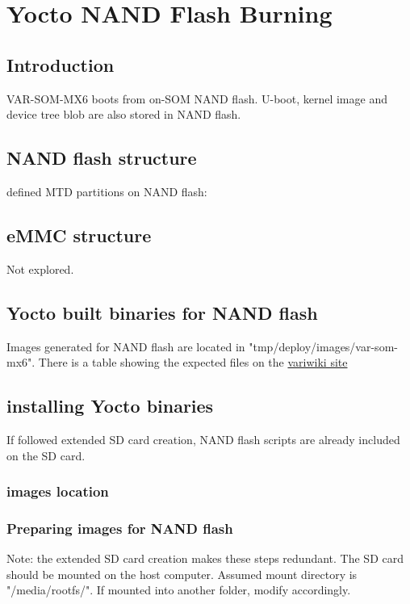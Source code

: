 \documentclass[10pt]{article}
\begin{document}
\section{Yocto NAND Flash Burning\label{sect:NANDFlash}}
\subsection{ Introduction }
VAR-SOM-MX6 boots from on-SOM NAND flash. U-boot, kernel image and device tree blob are also stored in NAND flash.

\subsection{ NAND flash structure }
defined MTD partitions on NAND flash:

\subsection{ eMMC structure }
Not explored.

\subsection{ Yocto built binaries for NAND flash }
Images generated for NAND flash are located in "tmp/deploy/images/var-som-mx6". There is a table showing the expected files on the
\href{http://variwiki.com/index.php?title=Yocto\_NAND\_Flash\_Burning&release=RELEASE\_SUMO\_V1.1\_VAR-SOM-MX6#Yocto\_Built\_binaries\_for\_NAND\_flash\_.2F\_eMMC}{variwiki site}

\subsection{ installing Yocto binaries }
If followed extended SD card creation, NAND flash scripts are already included on the SD card.

\subsubsection{ images location }
%

\subsubsection{ Preparing images for NAND flash }
Note: the extended SD card creation makes these steps redundant.
The SD card should be mounted on the host computer. Assumed mount directory is "/media/rootfs/". If mounted into another folder, modify accordingly.
\end{document}
